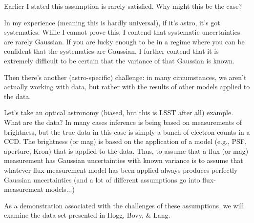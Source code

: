 \documentclass[11pt]{article}
\begin{document}
    Earlier I stated this assumption is rarely satisfied. Why might this be
the case?

In my experience (meaning this is hardly universal), if it's astro, it's
got systematics. While I cannot prove this, I contend that systematic
uncertainties are rarely Gaussian. If you are lucky enough to be in a
regime where you can be confident that the systematics are Gaussian, I
further contend that it is extremely difficult to be certain that the
variance of that Gaussian is known.

    Then there's another (astro-specific) challenge: in many circumstances,
we aren't actually working with data, but rather with the results of
other models applied to the data.

Let's take an optical astronomy (biased, but this is LSST after all)
example. What are the data? In many cases inference is being based on
measurements of brightness, but the true data in this case is simply a
bunch of electron counts in a CCD. The brightness (or mag) is based on
the application of a model (e.g., PSF, aperture, Kron) that is applied
to the data. Thus, to assume that a flux (or mag) measurement has
Gaussian uncertainties with known variance is to assume that whatever
flux-measurement model has been applied always produces perfectly
Gaussian uncertainties (and a lot of different assumptions go into
flux-measurement models...)

    As a demonstration associated with the challenges of these assumptions,
we will examine the data set presented in Hogg, Bovy, \& Lang.
\end{document}
